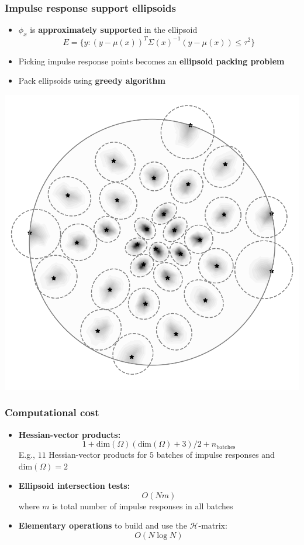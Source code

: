 \documentclass[10pt,final,xcolor=dvipsnames,aspect ratio=169]{beamer}
\begin{document}
\begin{frame}
	\frametitle{Impulse response support ellipsoids}
	\begin{itemize}
		\item $\phi_x$ is \textbf{approximately supported} in the ellipsoid
		$$E = \{y: (y - \mu(x))^T\Sigma(x)^{-1}(y - \mu(x)) \le \tau^2\}$$
		
		\item Picking impulse response points becomes an \textbf{ellipsoid packing problem}
		
		\item Pack ellipsoids using \textbf{greedy algorithm}
	\end{itemize}
	\begin{center}
		\includegraphics[width=0.375\columnwidth]{impulse_batch2.png} 
	\end{center}
\end{frame}


\begin{frame}
	\frametitle{Computational cost}
	\begin{itemize}
		\setlength\itemsep{2em}
		\item \textbf{Hessian-vector products:} 
		$$1+\text{dim}(\Omega)(\text{dim}(\Omega)+3)/2 + n_\text{batches}$$
		E.g., $11$ Hessian-vector products for $5$ batches of impulse responses and $\text{dim}(\Omega)=2$
		\item \textbf{Ellipsoid intersection tests:}
		$$O(Nm)$$
		where $m$ is total number of impulse responses in all batches
		\item \textbf{Elementary operations} to build and use the $\mathcal{H}$-matrix:
		$$O(N \log N)$$ 
	\end{itemize}
\end{frame}



\end{document}
